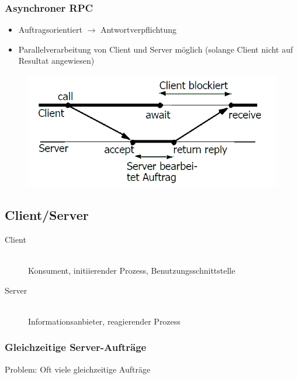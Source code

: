 \documentclass[10pt,a4paper]{article}
\begin{document}
\subsubsection{Asynchroner RPC}
\begin{itemize}
\item Auftragsorientiert $\rightarrow$ Antwortverpflichtung
\item Parallelverarbeitung von Client und Server möglich (solange Client nicht auf Resultat angewiesen)
\end{itemize}
\begin{figure}[h]
\includegraphics[scale=0.2]{./Bilder/Asynchroner_RPC}
\end{figure}


\subsection{Client/Server}
\begin{description}
\item[Client]\hfill\\Konsument, initiierender Prozess, Benutzungsschnittstelle
\item[Server]\hfill\\Informationsanbieter, reagierender Prozess
\end{description}

\subsubsection{Gleichzeitige Server-Aufträge}
Problem: Oft viele gleichzeitige Aufträge
\end{document}
